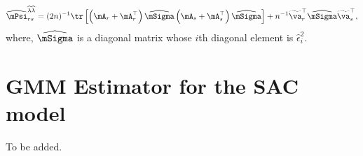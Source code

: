\documentclass[english,12pt]{book}\usepackage[]{graphicx}\usepackage[]{xcolor}
\begin{document}
\begin{equation}
  \widehat{\mPsi}^{\widehat{\lambda}\widehat{\lambda}}_{rs} = (2n)^{-1}\tr\left[\left(\mA_r + \mA_r^\top\right)\widehat{\mSigma}\left(\mA_s + \mA_s^\top\right)\widehat{\mSigma}\right]  + n^{-1}\widetilde{\va}_r^\top\widehat{\mSigma}\widetilde{\va}_s^\top,
\end{equation}
%
where, $\widehat{\mSigma}$ is a diagonal matrix whose $i$th diagonal element is $\widehat{\epsilon}_i^2$. 


\section{GMM Estimator for the SAC model}

To be added. 
% 
\end{document}
